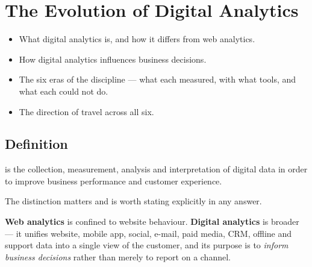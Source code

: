 
\chapter{The Evolution of Digital Analytics}


\begin{learningoutcomes}
\begin{itemize}
\item What digital analytics is, and how it differs from web analytics.
\item How digital analytics influences business decisions.
\item The six eras of the discipline --- what each measured, with what tools, and
      what each could not do.
\item The direction of travel across all six.
\end{itemize}
\end{learningoutcomes}

\section{Definition}

\begin{definitionbox}
 is the collection, measurement,
analysis and interpretation of digital data in order to improve business
performance and customer experience.
\end{definitionbox}

\begin{keybox}
The distinction matters and is worth stating explicitly in any answer.

\smallskip
\textbf{Web analytics} is confined to website behaviour. \textbf{Digital
analytics} is broader --- it unifies website, mobile app, social, e-mail, paid
media, CRM, offline and support data into a single view of the customer, and its
purpose is to \emph{inform business decisions} rather than merely to report on a
channel.
\end{keybox}

